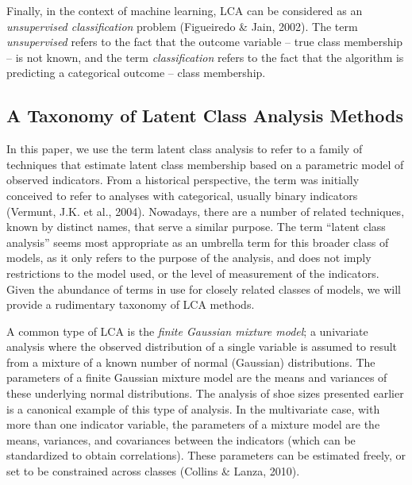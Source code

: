 \documentclass[
  ,man,floatsintext]{apa6}
\begin{document}
Finally, in the context of machine learning, LCA can be considered as an
\emph{unsupervised classification} problem (Figueiredo \& Jain, 2002).
The term \emph{unsupervised} refers to the fact that the outcome variable --
true class membership -- is not known, and the term \emph{classification}
refers to the fact that the algorithm is predicting a categorical
outcome -- class membership.

\hypertarget{a-taxonomy-of-latent-class-analysis-methods}{%
\subsection{A Taxonomy of Latent Class Analysis Methods}\label{a-taxonomy-of-latent-class-analysis-methods}}

In this paper, we use the term latent class analysis to refer to a
family of techniques that estimate latent class membership based on a
parametric model of observed indicators. From a historical perspective,
the term was initially conceived to refer to analyses with categorical,
usually binary indicators (Vermunt, J.K. et al., 2004). Nowadays, there are
a number of related techniques, known by distinct names, that serve a
similar purpose. The term ``latent class analysis'' seems most appropriate
as an umbrella term for this broader class of models, as it only refers
to the purpose of the analysis, and does not imply restrictions to the
model used, or the level of measurement of the indicators. Given the
abundance of terms in use for closely related classes of models, we will
provide a rudimentary taxonomy of LCA methods.

A common type of LCA is the \emph{finite Gaussian mixture model}; a
univariate analysis where the observed distribution of a single variable
is assumed to result from a mixture of a known number of normal
(Gaussian) distributions. The parameters of a finite Gaussian mixture
model are the means and variances of these underlying normal
distributions. The analysis of shoe sizes presented earlier is a
canonical example of this type of analysis. In the multivariate case,
with more than one indicator variable, the parameters of a mixture model
are the means, variances, and covariances between the indicators (which
can be standardized to obtain correlations). These parameters can be
estimated freely, or set to be constrained across classes (Collins \& Lanza, 2010).
\end{document}
